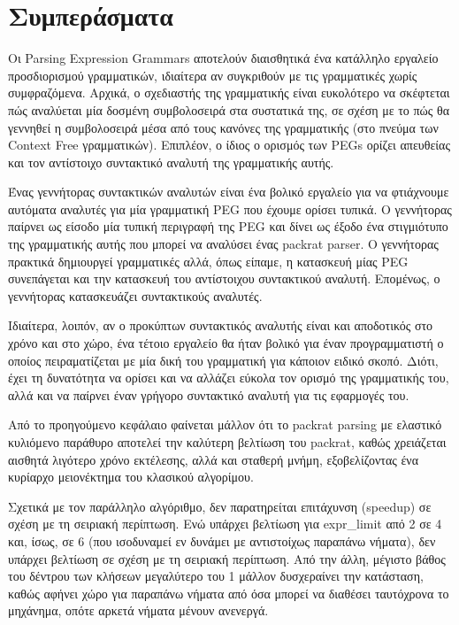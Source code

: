 \chapter{ Συμπεράσματα }
\label{ch:conclusions}

Οι Parsing Expression Grammars αποτελούν διαισθητικά ένα κατάλληλο εργαλείο προσδιορισμού γραμματικών, ιδιαίτερα αν συγκριθούν με τις γραμματικές χωρίς συμφραζόμενα. 
Αρχικά, ο σχεδιαστής της γραμματικής είναι ευκολότερο να σκέφτεται πώς αναλύεται μία δοσμένη συμβολοσειρά στα συστατικά της, σε σχέση με το πώς θα γεννηθεί η συμβολοσειρά μέσα από τους κανόνες της γραμματικής (στο πνεύμα των Context Free γραμματικών).
Επιπλέον, ο ίδιος ο ορισμός των PEGs ορίζει απευθείας και τον αντίστοιχο συντακτικό αναλυτή της γραμματικής αυτής.

Ένας γεννήτορας συντακτικών αναλυτών είναι ένα βολικό εργαλείο για να φτιάχνουμε αυτόματα αναλυτές για μία γραμματική PEG που έχουμε ορίσει τυπικά.
Ο γεννήτορας παίρνει ως είσοδο μία τυπική περιγραφή της PEG και δίνει ως έξοδο ένα στιγμιότυπο της γραμματικής αυτής που μπορεί να αναλύσει ένας packrat parser.
Ο γεννήτορας πρακτικά δημιουργεί γραμματικές αλλά, όπως είπαμε, η κατασκευή μίας PEG συνεπάγεται και την κατασκευή του αντίστοιχου συντακτικού αναλυτή.
Επομένως, ο γεννήτορας κατασκευάζει συντακτικούς αναλυτές.

Ιδιαίτερα, λοιπόν, αν ο προκύπτων συντακτικός αναλυτής είναι και αποδοτικός στο χρόνο και στο χώρο, ένα τέτοιο εργαλείο θα ήταν βολικό για έναν προγραμματιστή ο οποίος πειραματίζεται με μία δική του γραμματική για κάποιον ειδικό σκοπό.
Διότι, έχει τη δυνατότητα να ορίσει και να αλλάζει εύκολα τον ορισμό της γραμματικής του, αλλά και να παίρνει έναν γρήγορο συντακτικό αναλυτή για τις εφαρμογές του.

Από το προηγούμενο κεφάλαιο φαίνεται μάλλον ότι το packrat parsing με ελαστικό κυλιόμενο παράθυρο αποτελεί την καλύτερη βελτίωση του packrat, καθώς χρειάζεται αισθητά λιγότερο χρόνο εκτέλεσης, αλλά και σταθερή μνήμη, εξοβελίζοντας ένα κυρίαρχο μειονέκτημα του κλασικού αλγορίμου.

Σχετικά με τον παράλληλο αλγόριθμο, δεν παρατηρείται επιτάχυνση (speedup) σε σχέση με τη σειριακή περίπτωση.
Ενώ υπάρχει βελτίωση για expr\_limit από 2 σε 4 και, ίσως, σε 6 (που ισοδυναμεί εν δυνάμει με αντιστοίχως παραπάνω νήματα), δεν υπάρχει βελτίωση σε σχέση με τη σειριακή περίπτωση.
Από την άλλη, μέγιστο βάθος του δέντρου των κλήσεων μεγαλύτερο του 1 μάλλον δυσχεραίνει την κατάσταση, καθώς αφήνει χώρο για παραπάνω νήματα από όσα μπορεί να διαθέσει ταυτόχρονα το μηχάνημα, οπότε αρκετά νήματα μένουν ανενεργά.

